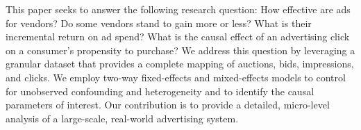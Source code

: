 This paper seeks to answer the following research question: How effective are ads for vendors? Do some vendors stand to gain more or less? What is their incremental return on ad spend? What is the causal effect of an advertising click on a consumer's propensity to purchase? We address this question by leveraging a granular dataset that provides a complete mapping of auctions, bids, impressions, and clicks. We employ two-way fixed-effects and mixed-effects models to control for unobserved confounding and heterogeneity and to identify the causal parameters of interest. Our contribution is to provide a detailed, micro-level analysis of a large-scale, real-world advertising system.

